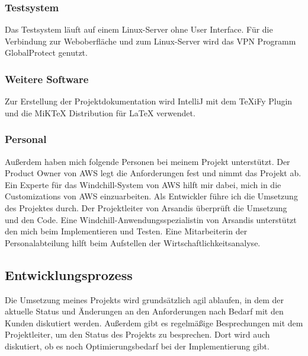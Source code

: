 \subsubsection{Testsystem}
Das Testsystem läuft auf einem Linux-Server ohne User Interface.
Für die Verbindung zur Weboberfläche und zum Linux-Server wird das VPN Programm GlobalProtect genutzt.

\subsubsection{Weitere Software}
Zur Erstellung der Projektdokumentation wird IntelliJ mit dem TeXiFy Plugin und die MiKTeX Distribution für LaTeX verwendet.

\subsubsection{Personal}
Außerdem haben mich folgende Personen bei meinem Projekt unterstützt.
Der Product Owner von \acs{AWS} legt die Anforderungen fest und nimmt das Projekt ab.
Ein Experte für das Windchill-System von \acs{AWS} hilft mir dabei, mich in die Customizations von \acs{AWS} einzuarbeiten.
Als Entwickler führe ich die Umsetzung des Projektes durch.
Der Projektleiter von Arsandis überprüft die Umsetzung und den Code.
Eine Windchill-Anwendungsspezialistin von Arsandis unterstützt den mich beim Implementieren und Testen.
Eine Mitarbeiterin der Personalabteilung hilft beim Aufstellen der Wirtschaftlichkeitsanalyse.

\subsection{Entwicklungsprozess}
\label{sec:Entwicklungsprozess}

Die Umsetzung meines Projekts wird grundsätzlich agil ablaufen, in dem der aktuelle Status und Änderungen an den Anforderungen nach Bedarf mit den Kunden diskutiert werden.
Außerdem gibt es regelmäßige Besprechungen mit dem Projektleiter, um den Status des Projekts zu besprechen.
Dort wird auch diskutiert, ob es noch Optimierungsbedarf bei der Implementierung gibt.
